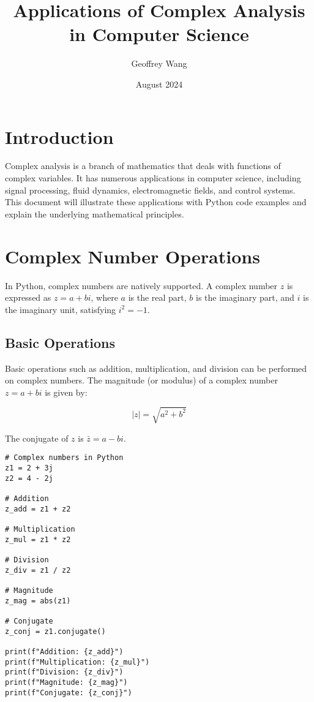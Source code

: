 \documentclass{article}
\title{Applications of Complex Analysis in Computer Science}
\author{Geoffrey Wang}
\date{August 2024}
\begin{document}
\maketitle

\section{Introduction}
Complex analysis is a branch of mathematics that deals with functions of complex variables. It has numerous applications in computer science, including signal processing, fluid dynamics, electromagnetic fields, and control systems. This document will illustrate these applications with Python code examples and explain the underlying mathematical principles.

\section{Complex Number Operations}
In Python, complex numbers are natively supported. A complex number \( z \) is expressed as \( z = a + bi \), where \( a \) is the real part, \( b \) is the imaginary part, and \( i \) is the imaginary unit, satisfying \( i^2 = -1 \).

\subsection{Basic Operations}
Basic operations such as addition, multiplication, and division can be performed on complex numbers. The magnitude (or modulus) of a complex number \( z = a + bi \) is given by:

\[
|z| = \sqrt{a^2 + b^2}
\]

The conjugate of \( z \) is \( \bar{z} = a - bi \).

\begin{lstlisting}[caption={complex_number_operations.py -- Basic Complex Number Operations}, label=code:complex_number_operations]
# Complex numbers in Python
z1 = 2 + 3j
z2 = 4 - 2j

# Addition
z_add = z1 + z2

# Multiplication
z_mul = z1 * z2

# Division
z_div = z1 / z2

# Magnitude
z_mag = abs(z1)

# Conjugate
z_conj = z1.conjugate()

print(f"Addition: {z_add}")
print(f"Multiplication: {z_mul}")
print(f"Division: {z_div}")
print(f"Magnitude: {z_mag}")
print(f"Conjugate: {z_conj}")
\end{lstlisting}
\end{document}
